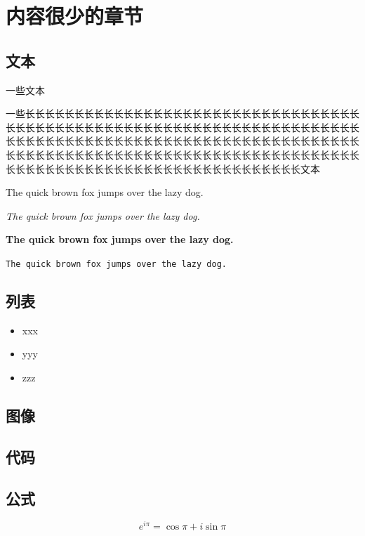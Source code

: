 \chapter{内容很少的章节}

\section{文本}

一些文本

一些长长长长长长长长长长长长长长长长长长长长长长长长长长长长长长长长长长长长长长长长长长长长长长长长长长长长长长长长长长长长长长长长长长长长长长长长长长长长长长长长长长长长长长长长长长长长长长长长长长长长长长长长长长长长长长长长长长长长长长长长长长长长长长长长长长长长长长长长长长长长长长长长长长长长长长长长长长长长长长长长长长长长长长长长长长长长文本

The quick brown fox jumps over the lazy dog.

\textit{The quick brown fox jumps over the lazy dog.}

\textbf{The quick brown fox jumps over the lazy dog.}

\texttt{The quick brown fox jumps over the lazy dog.}

\section{列表}

\begin{itemize}
    \item xxx
    \item yyy
    \item zzz
\end{itemize}

\section{图像}


\section{代码}


\section{公式}

\[
    e^{i\pi}=\cos\pi+i\sin\pi
\]
